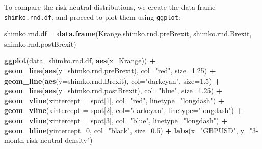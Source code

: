 \documentclass[]{book}
\newenvironment{Shaded}{\begin{snugshade}}{\end{snugshade}}
\newcommand{\KeywordTok}[1]{\textcolor[rgb]{0.13,0.29,0.53}{\textbf{#1}}}
\newcommand{\DataTypeTok}[1]{\textcolor[rgb]{0.13,0.29,0.53}{#1}}
\newcommand{\DecValTok}[1]{\textcolor[rgb]{0.00,0.00,0.81}{#1}}
\newcommand{\FloatTok}[1]{\textcolor[rgb]{0.00,0.00,0.81}{#1}}
\newcommand{\StringTok}[1]{\textcolor[rgb]{0.31,0.60,0.02}{#1}}
\newcommand{\OperatorTok}[1]{\textcolor[rgb]{0.81,0.36,0.00}{\textbf{#1}}}
\newcommand{\NormalTok}[1]{#1}
\theoremstyle{definition}
\theoremstyle{definition}
\theoremstyle{definition}
\theoremstyle{remark}
\begin{document}
To compare the risk-neutral distributions, we create the data frame
\texttt{shimko.rnd.df}, and proceed to plot them using \texttt{ggplot}:

\begin{Shaded}
\begin{Highlighting}[]
\NormalTok{shimko.rnd.df =}\StringTok{ }\KeywordTok{data.frame}\NormalTok{(Krange,shimko.rnd.preBrexit, shimko.rnd.Brexit, shimko.rnd.postBrexit)}

\KeywordTok{ggplot}\NormalTok{(}\DataTypeTok{data=}\NormalTok{shimko.rnd.df, }\KeywordTok{aes}\NormalTok{(}\DataTypeTok{x=}\NormalTok{Krange)) }\OperatorTok{+}\StringTok{ }\KeywordTok{geom_line}\NormalTok{(}\KeywordTok{aes}\NormalTok{(}\DataTypeTok{y=}\NormalTok{shimko.rnd.preBrexit), }\DataTypeTok{col=}\StringTok{"red"}\NormalTok{, }\DataTypeTok{size=}\FloatTok{1.25}\NormalTok{) }\OperatorTok{+}
\StringTok{  }\KeywordTok{geom_line}\NormalTok{(}\KeywordTok{aes}\NormalTok{(}\DataTypeTok{y=}\NormalTok{shimko.rnd.Brexit), }\DataTypeTok{col=}\StringTok{"darkcyan"}\NormalTok{, }\DataTypeTok{size=}\FloatTok{1.5}\NormalTok{) }\OperatorTok{+}
\StringTok{  }\KeywordTok{geom_line}\NormalTok{(}\KeywordTok{aes}\NormalTok{(}\DataTypeTok{y=}\NormalTok{shimko.rnd.postBrexit), }\DataTypeTok{col=}\StringTok{"blue"}\NormalTok{, }\DataTypeTok{size=}\FloatTok{1.25}\NormalTok{) }\OperatorTok{+}
\StringTok{  }\KeywordTok{geom_vline}\NormalTok{(}\DataTypeTok{xintercept =}\NormalTok{ spot[}\DecValTok{1}\NormalTok{], }\DataTypeTok{col=}\StringTok{"red"}\NormalTok{, }\DataTypeTok{linetype=}\StringTok{"longdash"}\NormalTok{) }\OperatorTok{+}\StringTok{ }
\StringTok{  }\KeywordTok{geom_vline}\NormalTok{(}\DataTypeTok{xintercept =}\NormalTok{ spot[}\DecValTok{2}\NormalTok{], }\DataTypeTok{col=}\StringTok{"darkcyan"}\NormalTok{, }\DataTypeTok{linetype=}\StringTok{"longdash"}\NormalTok{) }\OperatorTok{+}
\StringTok{  }\KeywordTok{geom_vline}\NormalTok{(}\DataTypeTok{xintercept =}\NormalTok{ spot[}\DecValTok{3}\NormalTok{], }\DataTypeTok{col=}\StringTok{"blue"}\NormalTok{, }\DataTypeTok{linetype=}\StringTok{"longdash"}\NormalTok{) }\OperatorTok{+}
\StringTok{  }\KeywordTok{geom_hline}\NormalTok{(}\DataTypeTok{yintercept=}\DecValTok{0}\NormalTok{, }\DataTypeTok{col=}\StringTok{"black"}\NormalTok{, }\DataTypeTok{size=}\FloatTok{0.5}\NormalTok{) }\OperatorTok{+}
\StringTok{  }\KeywordTok{labs}\NormalTok{(}\DataTypeTok{x=}\StringTok{"GBPUSD"}\NormalTok{, }\DataTypeTok{y=}\StringTok{"3-month risk-neutral density"}\NormalTok{)   }
\end{Highlighting}
\end{Shaded}
\end{document}
